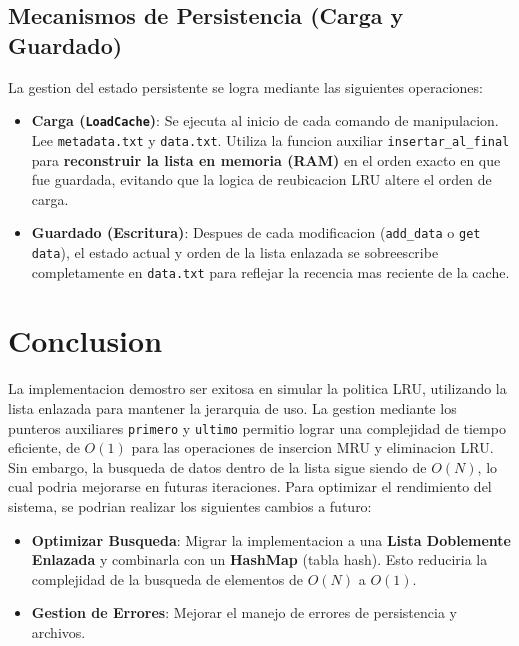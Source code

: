     \subsection{Mecanismos de Persistencia (Carga y Guardado)}
    La gestion del estado persistente se logra mediante las siguientes operaciones:
    \begin{itemize}
        \item \textbf{Carga (\texttt{LoadCache})}: Se ejecuta al inicio de cada comando de manipulacion. Lee \texttt{metadata.txt} y \texttt{data.txt}. Utiliza la funcion auxiliar \texttt{insertar\_al\_final} para \textbf{reconstruir la lista en memoria (RAM)} en el orden exacto en que fue guardada, evitando que la logica de reubicacion LRU altere el orden de carga.
        \item \textbf{Guardado (Escritura)}: Despues de cada modificacion (\texttt{add\_data} o \texttt{get data}), el estado actual y orden de la lista enlazada se sobreescribe completamente en \texttt{data.txt} para reflejar la recencia mas reciente de la cache.
    \end{itemize}
\newpage
\section{Conclusion}
La implementacion demostro ser exitosa en simular la politica LRU, utilizando la lista enlazada para mantener la jerarquia de uso. 
La gestion mediante los punteros auxiliares \texttt{primero} y \texttt{ultimo} permitio lograr una complejidad de tiempo eficiente, de $O(1)$ para las operaciones de insercion MRU y eliminacion LRU. 
Sin embargo, la busqueda de datos dentro de la lista sigue siendo de $O(N)$, lo cual podria mejorarse en futuras iteraciones.
Para optimizar el rendimiento del sistema, se podrian realizar los siguientes cambios a futuro:
\begin{itemize}
    \item \textbf{Optimizar Busqueda}: Migrar la implementacion a una \textbf{Lista Doblemente Enlazada} y combinarla con un \textbf{HashMap} (tabla hash). Esto reduciria la complejidad de la busqueda de elementos de $O(N)$ a $O(1)$.
    \item \textbf{Gestion de Errores}: Mejorar el manejo de errores de persistencia y archivos.
\end{itemize}
